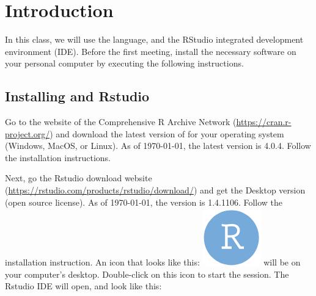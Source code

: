 \hypertarget{intro}{%
\chapter{Introduction}\label{intro}}

In this class, we will use the \R language, and the RStudio integrated development environment (IDE). Before the first meeting, install the necessary software on your personal computer by executing the following instructions.

\hypertarget{installing-r-and-rstudio}{%
\section{Installing \R and Rstudio}\label{installing-r-and-rstudio}}

Go to the website of the Comprehensive R Archive Network (\url{https://cran.r-project.org/}) and download the latest version of \R for your operating system (Windows, MacOS, or Linux). As of \today, the latest version is 4.0.4. Follow the installation instructions.

Next, go the Rstudio download website
(\url{https://rstudio.com/products/rstudio/download/}) and get the Desktop version
(open source license). As of \today, the version is 1.4.1106. Follow the
installation instruction. An icon that looks like this:
\includegraphics[width=\textwidth,height=0.025\textheight]{images/RstudioLogo.png}
will be on your computer's desktop. Double-click on this icon to start the \R session. The Rstudio IDE will open, and look like this:

